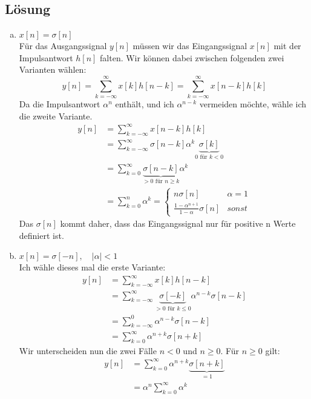 \subsection*{Lösung}
	\begin{enumerate}[a)]
		\item $x[n]=\sigma [n]$ \\
			Für das Ausgangssignal $y[n]$ müssen wir das Eingangssignal $x[n]$ mit der Impulsantwort $h[n]$ falten. Wir können dabei zwischen folgenden zwei Varianten wählen:
			\[
				y[n] = \sum_{k=-\infty}^{\infty}x[k]h[n-k]=\sum_{k=-\infty}^{\infty}x[n-k]h[k]
			\]
			Da die Impulsantwort $\alpha ^n$ enthält, und ich $\alpha ^{n-k}$ vermeiden möchte, wähle ich die zweite Variante.
			\begin{align*}
				y[n]	&= \sum_{k=-\infty}^{\infty}x[n-k]h[k] \\
						&= \sum_{k=-\infty}^{\infty}\sigma [n-k] \alpha^k \underbrace{\sigma [k]}_{0 \text{ für } k<0} \\
						&= \sum_{k=0}^{\infty}\underbrace{\sigma [n-k]}_{>0 \text{ für } n \ge k} \alpha^k \\
						&= \sum_{k=0}^{n} \alpha^k = \left\{ \begin{array}{ll} n\sigma [n] & \alpha=1\\ \frac{1-\alpha^{n+1}}{1-\alpha}\sigma [n] & sonst \end{array} \right.
			\end{align*}
			Das $\sigma [n]$ kommt daher, dass das Eingangssignal nur für positive n Werte definiert ist.
		\item $x[n]=\sigma [-n], \quad |\alpha|<1$ \\
			Ich wähle dieses mal die erste Variante:
			\begin{align*}
				y[n]	&= \sum_{k=-\infty}^{\infty}x[k]h[n-k] \\
						&= \sum_{k=-\infty}^{\infty}\underbrace{\sigma [-k]}_{>0 \text{ für } k \le 0} \alpha ^{n-k} \sigma [n-k] \\
						&= \sum_{k=-\infty}^{0}\alpha^{n-k} \sigma [n-k] \\
						&= \sum_{k=0}^{\infty}\alpha^{n+k} \sigma [n+k]
			\end{align*}
			Wir unterscheiden nun die zwei Fälle $n<0$ und $n \ge 0$. Für $n \ge 0$ gilt:
			\begin{align*}
				y[n]	&= \sum_{k=0}^{\infty}\alpha^{n+k} \underbrace{\sigma [n+k]}_{=1} \\
						&= \alpha ^n \sum_{k=0}^{\infty}\alpha^{k} \\

\end{align*}
\end{enumerate}
